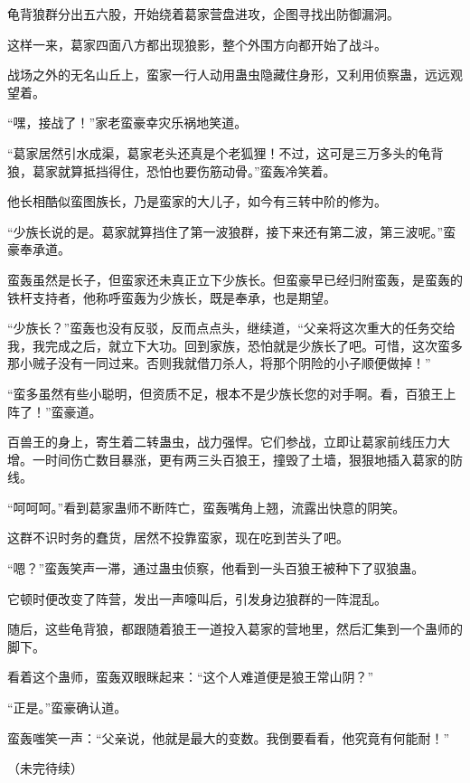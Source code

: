 \begin{this_body}
龟背狼群分出五六股，开始绕着葛家营盘进攻，企图寻找出防御漏洞。

这样一来，葛家四面八方都出现狼影，整个外围方向都开始了战斗。

战场之外的无名山丘上，蛮家一行人动用蛊虫隐藏住身形，又利用侦察蛊，远远观望着。

“嘿，接战了！”家老蛮豪幸灾乐祸地笑道。

“葛家居然引水成渠，葛家老头还真是个老狐狸！不过，这可是三万多头的龟背狼，葛家就算抵挡得住，恐怕也要伤筋动骨。”蛮轰冷笑着。

他长相酷似蛮图族长，乃是蛮家的大儿子，如今有三转中阶的修为。

“少族长说的是。葛家就算挡住了第一波狼群，接下来还有第二波，第三波呢。”蛮豪奉承道。

蛮轰虽然是长子，但蛮家还未真正立下少族长。但蛮豪早已经归附蛮轰，是蛮轰的铁杆支持者，他称呼蛮轰为少族长，既是奉承，也是期望。

“少族长？”蛮轰也没有反驳，反而点点头，继续道，“父亲将这次重大的任务交给我，我完成之后，就立下大功。回到家族，恐怕就是少族长了吧。可惜，这次蛮多那小贼子没有一同过来。否则我就借刀杀人，将那个阴险的小子顺便做掉！”

“蛮多虽然有些小聪明，但资质不足，根本不是少族长您的对手啊。看，百狼王上阵了！”蛮豪道。

百兽王的身上，寄生着二转蛊虫，战力强悍。它们参战，立即让葛家前线压力大增。一时间伤亡数目暴涨，更有两三头百狼王，撞毁了土墙，狠狠地插入葛家的防线。

“呵呵呵。”看到葛家蛊师不断阵亡，蛮轰嘴角上翘，流露出快意的阴笑。

这群不识时务的蠢货，居然不投靠蛮家，现在吃到苦头了吧。

“嗯？”蛮轰笑声一滞，通过蛊虫侦察，他看到一头百狼王被种下了驭狼蛊。

它顿时便改变了阵营，发出一声嚎叫后，引发身边狼群的一阵混乱。

随后，这些龟背狼，都跟随着狼王一道投入葛家的营地里，然后汇集到一个蛊师的脚下。

看着这个蛊师，蛮轰双眼眯起来：“这个人难道便是狼王常山阴？”

“正是。”蛮豪确认道。

蛮轰嗤笑一声：“父亲说，他就是最大的变数。我倒要看看，他究竟有何能耐！”

（未完待续）

\end{this_body}

